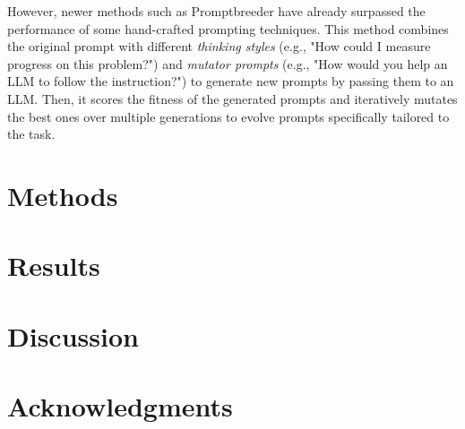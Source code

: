 \documentclass[fleqn,moreauthors,10pt]{ds_report}
\begin{document}
However, newer methods such as Promptbreeder \cite{promptbreeder} have already surpassed the performance of some hand-crafted prompting techniques. This method combines the original prompt with different \textit{thinking styles} (e.g., "How could I measure progress on this problem?") and \textit{mutator prompts} (e.g., "How would you help an LLM to follow the instruction?") to generate new prompts by passing them to an LLM. Then, it scores the fitness of the generated prompts and iteratively mutates the best ones over multiple generations to evolve prompts specifically tailored to the task.

\section*{Methods}



\section*{Results}



\section*{Discussion}



\section*{Acknowledgments}




\end{document}
